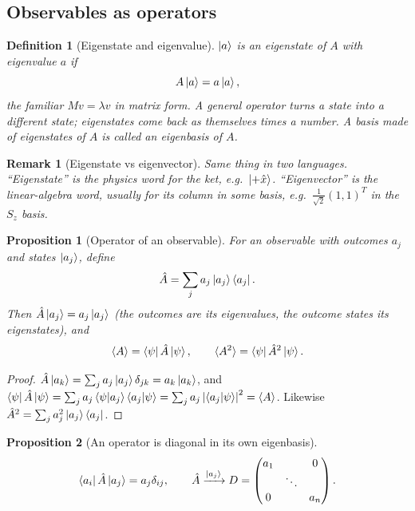 \documentclass{article}
\newtheorem{definition}{Definition}
\newtheorem{remark}{Remark}
\newtheorem{proposition}{Proposition}
\begin{document}
\subsection{Observables as operators}
\begin{definition}[Eigenstate and eigenvalue]
    $\ket{a}$ is an eigenstate of $A$ with eigenvalue $a$ if
    \begin{equation}
        A\ket{a} = a\ket{a},
    \end{equation}
    the familiar $Mv = \lambda v$ in matrix form. A general operator turns a state into a different state; eigenstates come back as themselves times a number. A basis made of eigenstates of $A$ is called an \emph{eigenbasis} of $A$.
\end{definition}
\begin{remark}[Eigenstate vs eigenvector]
    Same thing in two languages. ``Eigenstate'' is the physics word for the ket, e.g.\ $\ket{+\hat{x}}$. ``Eigenvector'' is the linear-algebra word, usually for its column in some basis, e.g.\ $\frac{1}{\sqrt{2}}(1,1)^T$ in the $S_z$ basis.
\end{remark}
\begin{proposition}[Operator of an observable]
    For an observable with outcomes $a_j$ and states $\ket{a_j}$, define
    \begin{equation}
        \hat{A} = \sum_j a_j\ket{a_j}\bra{a_j}.
    \end{equation}
    Then $\hat{A}\ket{a_j} = a_j\ket{a_j}$ (the outcomes are its eigenvalues, the outcome states its eigenstates), and
    \begin{equation}
        \braket{A} = \bra{\psi}\hat{A}\ket{\psi}, \qquad \braket{A^2} = \bra{\psi}\hat{A}^2\ket{\psi}.
    \end{equation}
\end{proposition}
\begin{proof}
    $\hat{A}\ket{a_k} = \sum_j a_j\ket{a_j}\delta_{jk} = a_k\ket{a_k}$, and
    $\bra{\psi}\hat{A}\ket{\psi} = \sum_j a_j\braket{\psi|a_j}\braket{a_j|\psi} = \sum_j a_j\left|\braket{a_j|\psi}\right|^2 = \braket{A}$. Likewise $\hat{A}^2 = \sum_j a_j^2\ket{a_j}\bra{a_j}$.
\end{proof}
\begin{proposition}[An operator is diagonal in its own eigenbasis]
    \begin{equation}
        \bra{a_i}\hat{A}\ket{a_j} = a_j\delta_{ij}, \qquad \hat{A} \xrightarrow{\ket{a_j}} D = \begin{pmatrix} a_1 & & 0 \\ & \ddots & \\ 0 & & a_n \end{pmatrix}.
    \end{equation}
\end{proposition}
\end{document}
